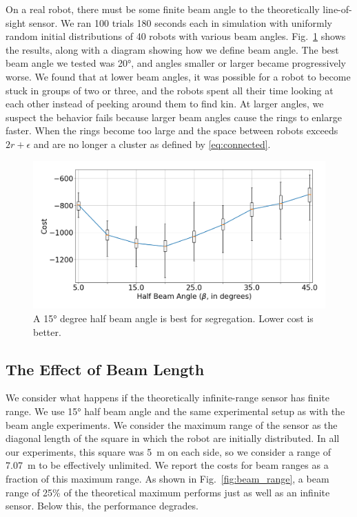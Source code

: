 \documentclass[letterpaper, 10 pt, conference]{ieeeconf}
\begin{document}
On a real robot, there must be some finite beam angle to the theoretically
line-of-sight sensor. We ran 100 trials 180 seconds each in simulation with uniformly random
initial distributions of 40 robots with various beam
angles. Fig.~\ref{fig:beam_angle} shows the results, along with a diagram
showing how we define beam angle. The best beam angle we tested was \ang{20},
and angles smaller or larger became progressively worse. We found that at lower
beam angles, it was possible for a robot to become stuck in groups of two or
three, and the robots spent all their time looking at each other instead of
peeking around them to find kin. At larger angles, we suspect the behavior fails
because larger beam angles cause the rings to enlarge faster. When the rings become
too large and the space between robots exceeds $2r+\epsilon$
and are no longer a cluster as defined by \eqref{eq:connected}.

\begin{figure}[t]
  \centering
  \includegraphics[width=1\linewidth]{./images/beam_angle}
  \caption{A \ang{15} degree half beam angle is best for segregation. Lower cost is better.}
  \label{fig:beam_angle}
\end{figure}

\subsection{The Effect of Beam Length} \label{section:beam_range}

We consider what happens if the theoretically infinite-range sensor has finite
range. We use \ang{15} half beam angle and the same experimental setup as with
the beam angle experiments. We consider the maximum range of the sensor as the
diagonal length of the square in which the robot are initially distributed. In
all our experiments, this square was \SI{5}{\meter} on each side, so we consider
a range of \SI{7.07}{\meter} to be effectively unlimited. We report the costs
for beam ranges as a fraction of this maximum range. As shown in
Fig.~\ref{fig:beam_range}, a beam range of 25\% of the theoretical maximum
performs just as well as an infinite sensor. Below this, the performance
degrades.
\end{document}
